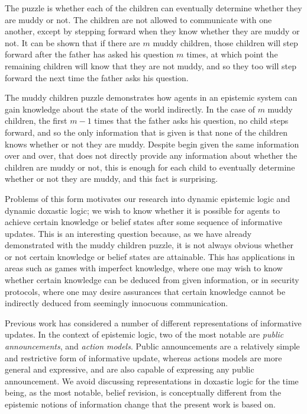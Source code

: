 The puzzle is whether each of the children can eventually determine whether
they are muddy or not. The children are not allowed to communicate with one
another, except by stepping forward when they know whether they are muddy or
not. It can be shown that if there are $m$ muddy children, those children will
step forward after the father has asked his question $m$ times, at which point
the remaining children will know that they are not muddy, and so they too will
step forward the next time the father asks his question.

The muddy children puzzle demonstrates how agents in an epistemic system can
gain knowledge about the state of the world indirectly. In the case of $m$ muddy
children, the first $m - 1$ times that the father asks his question, no child
steps forward, and so the only information that is given is that none of the
children knows whether or not they are muddy. Despite begin given the same
information over and over, that does not directly provide any information about
whether the children are muddy or not, this is enough for each child to
eventually determine whether or not they are muddy, and this fact is surprising.

Problems of this form motivates our research into dynamic epistemic logic and
dynamic doxastic logic; we wish to know whether it is possible for agents to
achieve certain knowledge or belief states after some sequence of informative
updates. This is an interesting question because, as we have already
demonstrated with the muddy children puzzle, it is not always obvious whether or
not certain knowledge or belief states are attainable. This has applications in
areas such as games with imperfect knowledge, where one may wish to know whether
certain knowledge can be deduced from given information, or in security
protocols, where one may desire assurances that certain knowledge cannot be
indirectly deduced from seemingly innocuous communication.

Previous work has considered a number of different representations of
informative updates. In the context of epistemic logic, two of the most notable
are {\em public announcements}, and {\em action models}. Public announcements
are a relatively simple and restrictive form of informative update, whereas
actions models are more general and expressive, and are also capable of
expressing any public announcement. We avoid discussing representations in
doxastic logic for the time being, as the most notable, belief revision, is
conceptually different from the epistemic notions of information change that
the present work is based on.

